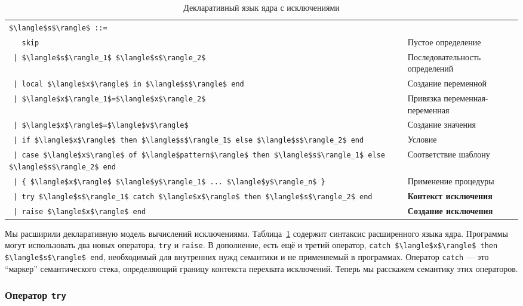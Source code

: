 \begin{table}
  \begin{tabular}{|ll|}
    \hline
    \lstinline|$\langle$s$\rangle$ ::=| & \\
    \lstinline|   skip| & Пустое определение \\
    \lstinline! | $\langle$s$\rangle_1$ $\langle$s$\rangle_2$! & Последовательность определений \\
    \lstinline! | local $\langle$x$\rangle$ in $\langle$s$\rangle$ end! & Создание переменной \\
    \lstinline! | $\langle$x$\rangle_1$=$\langle$x$\rangle_2$! & Привязка переменная-переменная \\
    \lstinline! | $\langle$x$\rangle$=$\langle$v$\rangle$! & Создание значения \\
    \lstinline! | if $\langle$x$\rangle$ then $\langle$s$\rangle_1$ else $\langle$s$\rangle_2$ end! & Условие \\
    \lstinline! | case $\langle$x$\rangle$ of $\langle$pattern$\rangle$ then $\langle$s$\rangle_1$ else $\langle$s$\rangle_2$ end! & Соответствие шаблону \\
    \lstinline! | { $\langle$x$\rangle$ $\langle$y$\rangle_1$ ... $\langle$y$\rangle_n$ }! & Применение процедуры \\
    \lstinline! | try $\langle$s$\rangle_1$ catch $\langle$x$\rangle$ then $\langle$s$\rangle_2$ end! & \textbf{Контекст исключения} \\
    \lstinline! | raise $\langle$x$\rangle$ end! & \textbf{Создание исключения} \\
    \hline
  \end{tabular}
\caption{Декларативный язык ядра с исключениями}
\label{table:declarative_kernel_language_with_exceptions}
\end{table}

Мы расширили декларативную модель вычислений исключениями. Таблица~\ref{table:declarative_kernel_language_with_exceptions} содержит синтаксис расширенного языка ядра. Программы могут использовать два новых оператора, \lstinline|try| и \lstinline|raise|. В дополнение, есть ещё и третий оператор, \lstinline|catch $\langle$x$\rangle$ then $\langle$s$\rangle$ end|, необходимый для внутренних нужд семантики и не применяемый в программах. Оператор \lstinline|catch| --- это ``маркер'' семантического стека, определяющий границу контекста перехвата исключений. Теперь мы расскажем семантику этих операторов.

\subsubsection{Оператор \lstinline|try|}

